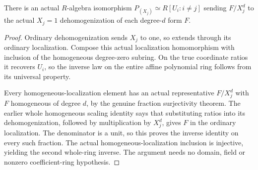 \begin{theorem}
\label{projective:native-homogeneous-chart-isomorphism}
\leanok
{}
There is an actual $R$-algebra isomorphism
$P_{(X_j)}\simeq R[U_i:i\ne j]$ sending $F/X_j^d$ to the actual
$X_j=1$ dehomogenization of each degree-$d$ form $F$.
\end{theorem}
\begin{proof}
Ordinary dehomogenization sends $X_j$ to one, so extends through its
ordinary localization. Compose this actual localization homomorphism
with inclusion of the homogeneous degree-zero subring. On the true
coordinate ratios it recovers $U_i$, so the inverse law on the entire
affine polynomial ring follows from its universal property.

Every homogeneous-localization element has an actual representative
$F/X_j^d$ with $F$ homogeneous of degree $d$, by the genuine fraction
surjectivity theorem. The earlier whole homogeneous scaling identity
says that substituting ratios into its dehomogenization, followed by
multiplication by $X_j^d$, gives $F$ in the ordinary localization.
The denominator is a unit, so this proves the inverse identity on every
such fraction. The actual homogeneous-localization inclusion is injective,
yielding the second whole-ring inverse. The argument needs no domain,
field or nonzero coefficient-ring hypothesis.
\end{proof}

